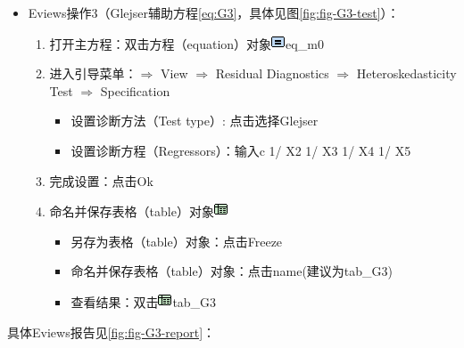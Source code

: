 \documentclass[12pt,(landscape,a4paper),(portrait,a4paper)]{article}
\providecommand{\tightlist}{%
  \setlength{\itemsep}{0pt}\setlength{\parskip}{0pt}}
\begin{document}
\begin{itemize}
\tightlist
\item
  Eviews操作3（Glejser辅助方程\eqref{eq:G3}，具体见图\ref{fig:fig-G3-test}）：

  \begin{enumerate}
  \def\labelenumi{\arabic{enumi})}
  \tightlist
  \item
    打开主方程：双击方程（equation）对象\includegraphics{picture/object/Equation.png}eq\_m0\\
  \item
    进入引导菜单：\(\Rightarrow\) View \(\Rightarrow\) Residual
    Diagnostics \(\Rightarrow\) Heteroskedasticity Test \(\Rightarrow\)
    Specification

    \begin{itemize}
    \tightlist
    \item
      设置诊断方法（Test type）: 点击选择Glejser
    \item
      设置诊断方程（Regressors）：输入c 1/ X2 1/ X3 1/ X4 1/ X5\\
    \end{itemize}
  \item
    完成设置：点击Ok\\
  \item
    命名并保存表格（table）对象\includegraphics{picture/object/Table.png}

    \begin{itemize}
    \tightlist
    \item
      另存为表格（table）对象：点击Freeze
    \item
      命名并保存表格（table）对象：点击name(建议为tab\_G3)
    \item
      查看结果：双击\includegraphics{picture/object/Table.png}tab\_G3
    \end{itemize}
  \end{enumerate}
\end{itemize}

具体Eviews报告见\ref{fig:fig-G3-report}：
\end{document}
